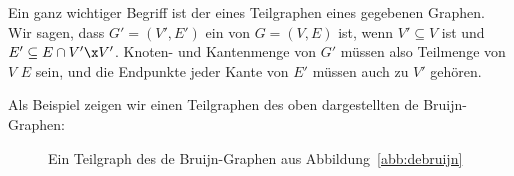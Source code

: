 
Ein ganz wichtiger Begriff ist der eines Teilgraphen eines gegebenen
Graphen.
% 
Wir sagen, dass $G'=(V',E')$ ein 
von $G=(V,E)$ ist, wenn $V'\subseteq V$ ist und $E'\subseteq E \cap
V'\x V'$.
% 
Knoten- und Kantenmenge von $G'$ müssen also Teilmenge von $V$ \resp
$E$ sein, und die Endpunkte jeder Kante von $E'$ müssen auch zu $V'$
gehören.

Als Beispiel zeigen wir einen Teilgraphen des oben dargestellten de
Bruijn-Graphen:

\begin{figure}[ht]
  \centering
  \caption{Ein Teilgraph des de Bruijn-Graphen aus Abbildung~\ref{abb:debruijn}}
  \label{abb:teilgraph}
\end{figure}
% 
